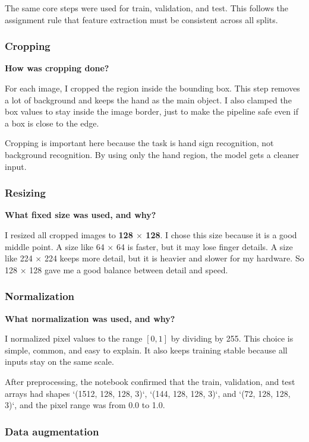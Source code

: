 \documentclass[12pt,a4paper]{article}
\newcommand{\qtext}[1]{\noindent\textbf{#1}\par}
\newcommand{\ansstart}{\begingroup\color{answerblue}}
\newcommand{\ansend}{\endgroup}
\begin{document}
The same core steps were used for train, validation, and test. This follows the assignment rule that feature extraction must be consistent across all splits.
\ansend

\subsubsection{Cropping}

\qtext{How was cropping done?}

\ansstart
For each image, I cropped the region inside the bounding box. This step removes a lot of background and keeps the hand as the main object. I also clamped the box values to stay inside the image border, just to make the pipeline safe even if a box is close to the edge.

Cropping is important here because the task is hand sign recognition, not background recognition. By using only the hand region, the model gets a cleaner input.
\ansend

\subsubsection{Resizing}

\qtext{What fixed size was used, and why?}

\ansstart
I resized all cropped images to \textbf{128 \(\times\) 128}. I chose this size because it is a good middle point. A size like 64 \(\times\) 64 is faster, but it may lose finger details. A size like 224 \(\times\) 224 keeps more detail, but it is heavier and slower for my hardware. So 128 \(\times\) 128 gave me a good balance between detail and speed.
\ansend

\subsubsection{Normalization}

\qtext{What normalization was used, and why?}

\ansstart
I normalized pixel values to the range \([0,1]\) by dividing by 255. This choice is simple, common, and easy to explain. It also keeps training stable because all inputs stay on the same scale.

After preprocessing, the notebook confirmed that the train, validation, and test arrays had shapes `(1512, 128, 128, 3)`, `(144, 128, 128, 3)`, and `(72, 128, 128, 3)`, and the pixel range was from 0.0 to 1.0.
\ansend

\subsubsection{Data augmentation}
\end{document}
